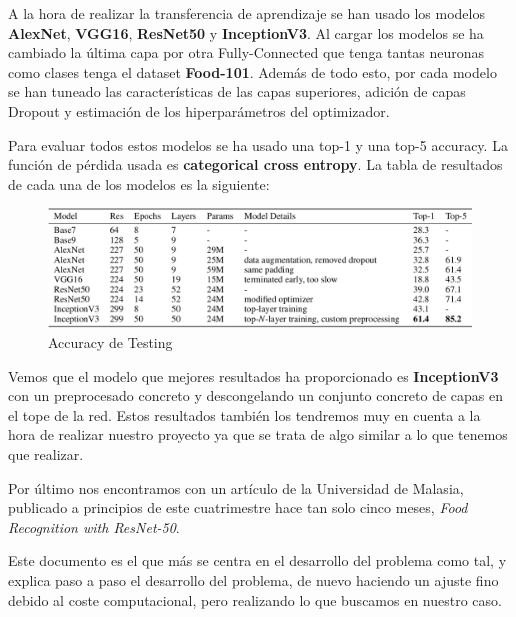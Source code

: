 \vspace{3 mm}

A la hora de realizar la transferencia de aprendizaje se han usado los modelos \textbf{AlexNet}, \textbf{VGG16}, \textbf{ResNet50} y \textbf{InceptionV3}. Al cargar los modelos se ha cambiado la última capa por otra Fully-Connected que tenga tantas neuronas como clases tenga el dataset \textbf{Food-101}. Además de todo esto, por cada modelo se han tuneado las características de las capas superiores, adición de capas Dropout y estimación de los hiperparámetros del optimizador.

\vspace{3 mm}

Para evaluar todos estos modelos se ha usado una top-1 y una top-5 accuracy. La función de pérdida usada es \textbf{categorical cross entropy}. La tabla de resultados de cada una de los modelos es la siguiente:

\vspace{5 mm}

\begin{figure}[H]
  \centering
  \includegraphics[width=1\linewidth]{Imagenes/tablapaper3.png}
  \caption{Accuracy de Testing}
  \label{fig:sub-first}
\end{figure}

\vspace{5 mm}

Vemos que el modelo que mejores resultados ha proporcionado es \textbf{InceptionV3} con un preprocesado concreto y descongelando un conjunto concreto de capas en el tope de la red. Estos resultados también los tendremos muy en cuenta a la hora de realizar nuestro proyecto ya que se trata de algo similar a lo que tenemos que realizar.


\newpage

Por último nos encontramos con un artículo de la Universidad de Malasia, publicado a principios de este cuatrimestre hace tan solo cinco meses,
\textit{Food Recognition with ResNet-50}\cite{food-resnet}.

Este documento es el que más se centra en el desarrollo del problema como tal, y explica paso a paso el desarrollo del problema, de nuevo haciendo un ajuste fino debido al coste computacional, pero realizando lo que buscamos en nuestro caso.

